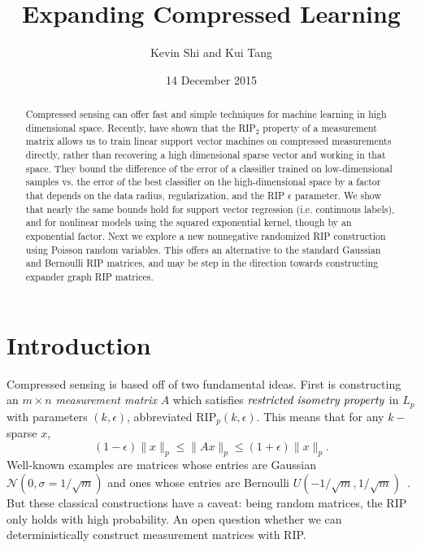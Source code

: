 \documentclass[english]{article}
\theoremstyle{plain}
\begin{document}
\title{Expanding Compressed Learning}

\author{Kevin Shi and Kui Tang}
\date{14 December 2015}
\maketitle
\begin{abstract}
Compressed sensing can offer fast and simple techniques for machine learning in high dimensional space. Recently, \citet{Calderbank09} have shown that the RIP$_2$ property of a measurement matrix allows us to train linear support vector machines on compressed measurements directly, rather than recovering a high dimensional sparse vector and working in that space.
They bound the difference of the error of a classifier trained on low-dimensional samples vs. the error of the best classifier on the high-dimensional space by a factor that depends on the data radius, regularization, and the RIP $\epsilon$ parameter.
We show that nearly the same bounds hold for support vector regression (i.e. continuous labels), and for nonlinear models using the squared exponential kernel, though by an exponential factor.
Next we explore a new nonnegative randomized RIP construction using Poisson random variables.
This offers an alternative to the standard Gaussian and Bernoulli RIP matrices, and may be step in the direction towards constructing expander graph RIP matrices.
\end{abstract}

\section{Introduction}

Compressed sensing is based off of two fundamental ideas.
First is constructing an $m \times n$ \emph{measurement matrix} $A$ which satisfies $\emph{restricted isometry property}$ in $L_p$ with parameters $(k,\epsilon)$, abbreviated $\mbox{RIP}_p(k,\epsilon)$.
This means that for any $k-$sparse $x$,
\[
(1-\epsilon)\|x\|_p \le\|Ax\|_p \le (1+\epsilon)\|x\|_p. \label{eq:RIP}
\]
Well-known examples are matrices whose entries are Gaussian $\mathcal{N}(0,\sigma=1/\sqrt{m})$ and ones whose entries are Bernoulli $U(-1/\sqrt{m},1/\sqrt{m})$~\citep{Baraniuk08}.
But these classical constructions have a caveat: being random matrices, the RIP only holds with high probability.
An open question whether we can deterministically construct measurement matrices with RIP.
\end{document}
